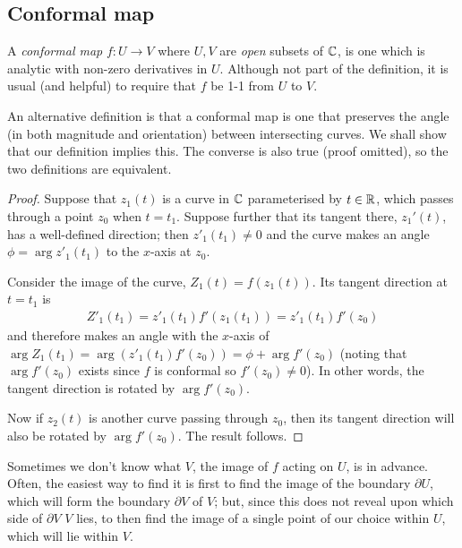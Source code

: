 \documentclass[a4paper]{article}
\begin{document}
\subsection{Conformal map}
\begin{defi}
A \emph{conformal map} $f:U \to V$ where $U,V$ are \emph{open} subsets of $\mathbb{C}$, is one which is analytic with non-zero derivatives in $U$. Although not part of the definition, it is usual (and helpful) to require that $f$ be 1-1 from $U$ to $V$.

An alternative definition is that a conformal map is one that preserves the angle (in both magnitude and orientation) between intersecting curves. We shall show that our definition implies this. The converse is also true (proof omitted), so the two definitions are equivalent.
\begin{proof}
Suppose that $z_1(t)$ is a curve in $\mathbb{C}$ parameterised by $t \in \mathbb{R}$, which passes through a point $z_0$ when $t=t_1$. Suppose further that its tangent there, $z_1'(t)$, has a well-defined direction; then $z'_1(t_1) \neq 0$ and the curve makes an angle $\phi = \arg z'_1(t_1)$ to the $x$-axis at $z_0$.

Consider the image of the curve, $Z_1(t) = f(z_1(t))$. Its tangent direction at $t=t_1$ is
\begin{equation*}
\begin{aligned}
Z'_1(t_1) = z'_1(t_1) f'(z_1(t_1)) = z'_1(t_1) f'(z_0)
\end{aligned}
\end{equation*}
and therefore makes an angle with the $x$-axis of $\arg Z_1(t_1) = \arg(z'_1(t_1) f'(z_0)) = \phi+\arg f'(z_0)$ (noting that $\arg f'(z_0)$ exists since $f$ is conformal so $f'(z_0) \neq 0$). In other words, the tangent direction is rotated by $\arg f'(z_0)$.

Now if $z_2(t)$ is another curve passing through $z_0$, then its tangent direction will also be rotated by $\arg f'(z_0)$. The result follows.
\end{proof}
\end{defi}

Sometimes we don't know what $V$, the image of $f$ acting on $U$, is in advance. Often, the easiest way to find it is first to find the image of the boundary $\partial U$, which will form the boundary $\partial V$ of $V$; but, since this does not reveal upon which side of $\partial V$ $V$ lies, to then find the image of a single point of our choice within $U$, which will lie within $V$.
\end{document}
